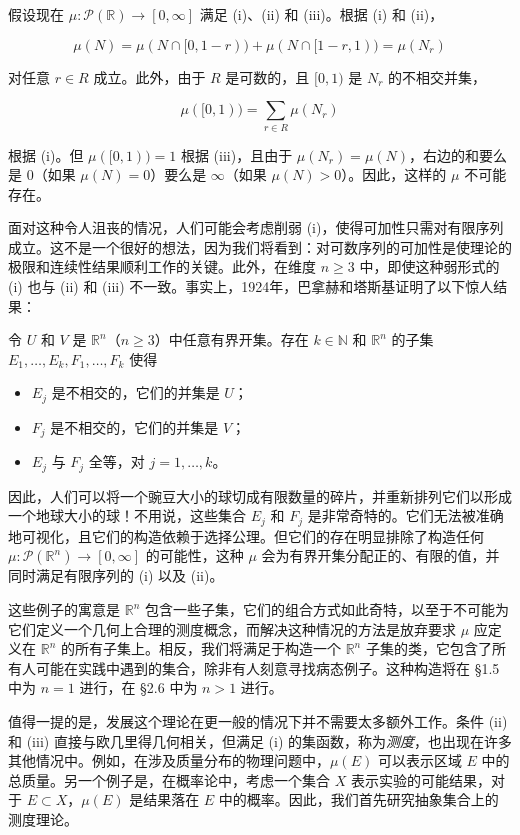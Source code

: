 \documentclass[lang=cn,10pt,thmcnt=section]{elegantbook}
\begin{document}
假设现在 $\mu : \mathcal{P}(\mathbb{R}) \to [0, \infty]$ 满足 (i)、(ii) 和 (iii)。根据 (i) 和 (ii)，

\[\mu(N) = \mu(N \cap [0, 1-r)) + \mu(N \cap [1-r, 1)) = \mu(N_r)\]

对任意 $r \in R$ 成立。此外，由于 $R$ 是可数的，且 $[0, 1)$ 是 $N_r$ 的不相交并集，

\[\mu([0, 1)) = \sum_{r \in R} \mu(N_r)\]

根据 (i)。但 $\mu([0, 1)) = 1$ 根据 (iii)，且由于 $\mu(N_r) = \mu(N)$，右边的和要么是 $0$（如果 $\mu(N) = 0$）要么是 $\infty$（如果 $\mu(N) > 0$）。因此，这样的 $\mu$ 不可能存在。

面对这种令人沮丧的情况，人们可能会考虑削弱 (i)，使得可加性只需对有限序列成立。这不是一个很好的想法，因为我们将看到：对可数序列的可加性是使理论的极限和连续性结果顺利工作的关键。此外，在维度 $n \geq 3$ 中，即使这种弱形式的 (i) 也与 (ii) 和 (iii) 不一致。事实上，1924年，巴拿赫和塔斯基证明了以下惊人结果：

令 $U$ 和 $V$ 是 $\mathbb{R}^n$（$n \geq 3$）中任意有界开集。存在 $k \in \mathbb{N}$ 和 $\mathbb{R}^n$ 的子集 $E_1, \ldots, E_k, F_1, \ldots, F_k$ 使得
\begin{itemize}
\item $E_j$ 是不相交的，它们的并集是 $U$；
\item $F_j$ 是不相交的，它们的并集是 $V$；
\item $E_j$ 与 $F_j$ 全等，对 $j = 1, \ldots, k$。
\end{itemize}

因此，人们可以将一个豌豆大小的球切成有限数量的碎片，并重新排列它们以形成一个地球大小的球！不用说，这些集合 $E_j$ 和 $F_j$ 是非常奇特的。它们无法被准确地可视化，且它们的构造依赖于选择公理。但它们的存在明显排除了构造任何 $\mu : \mathcal{P}(\mathbb{R}^n) \to [0, \infty]$ 的可能性，这种 $\mu$ 会为有界开集分配正的、有限的值，并同时满足有限序列的 (i) 以及 (ii)。

这些例子的寓意是 $\mathbb{R}^n$ 包含一些子集，它们的组合方式如此奇特，以至于不可能为它们定义一个几何上合理的测度概念，而解决这种情况的方法是放弃要求 $\mu$ 应定义在 $\mathbb{R}^n$ 的所有子集上。相反，我们将满足于构造一个 $\mathbb{R}^n$ 子集的类，它包含了所有人可能在实践中遇到的集合，除非有人刻意寻找病态例子。这种构造将在 \S1.5 中为 $n = 1$ 进行，在 \S2.6 中为 $n > 1$ 进行。

值得一提的是，发展这个理论在更一般的情况下并不需要太多额外工作。条件 (ii) 和 (iii) 直接与欧几里得几何相关，但满足 (i) 的集函数，称为\textit{测度}，也出现在许多其他情况中。例如，在涉及质量分布的物理问题中，$\mu(E)$ 可以表示区域 $E$ 中的总质量。另一个例子是，在概率论中，考虑一个集合 $X$ 表示实验的可能结果，对于 $E \subset X$，$\mu(E)$ 是结果落在 $E$ 中的概率。因此，我们首先研究抽象集合上的测度理论。
\end{document}
